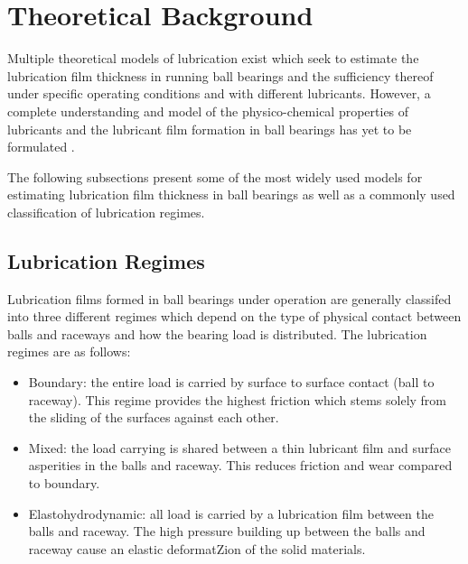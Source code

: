 
\section{Theoretical Background}
Multiple theoretical models of lubrication exist which seek to estimate the lubrication film thickness in running ball bearings and the sufficiency thereof under specific operating conditions and with different lubricants. However, a complete understanding and model of the physico-chemical properties of lubricants and the lubricant film formation in ball bearings has yet to be formulated \cite{cen_ehl_2021} \cite{dai_situ_2024} \cite{li_lubrication_2026}.

The following subsections present some of the most widely used models for estimating lubrication film thickness in ball bearings as well as a commonly used classification of lubrication regimes.

\subsection{Lubrication Regimes}
Lubrication films formed in ball bearings under operation are generally classifed into three different regimes which depend on the type of physical contact between balls and raceways and how the bearing load is distributed. The lubrication regimes are as follows:
\begin{itemize}
    \item Boundary: the entire load is carried by surface to surface contact (ball to raceway). This regime provides the highest friction which stems solely from the sliding of the surfaces against each other.
    \item Mixed: the load carrying is shared between a thin lubricant film and surface asperities in the balls and raceway. This reduces friction and wear compared to boundary.
    \item Elastohydrodynamic: all load is carried by a lubrication film between the balls and raceway. The high pressure building up between the balls and raceway cause an elastic deformatZion of the solid materials.
\end{itemize}

